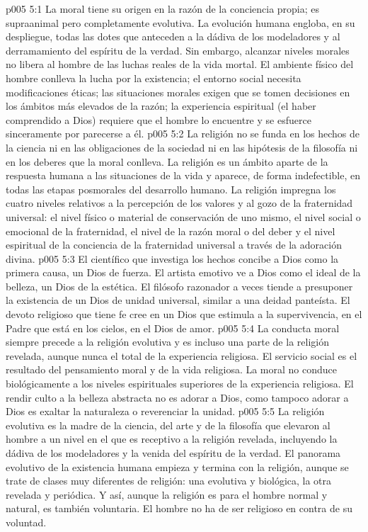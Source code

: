 \vs p005 5:1 La moral tiene su origen en la razón de la conciencia propia; es supraanimal pero completamente evolutiva. La evolución humana engloba, en su despliegue, todas las dotes que anteceden a la dádiva de los modeladores y al derramamiento del espíritu de la verdad. Sin embargo, alcanzar niveles morales no libera al hombre de las luchas reales de la vida mortal. El ambiente físico del hombre conlleva la lucha por la existencia; el entorno social necesita modificaciones éticas; las situaciones morales exigen que se tomen decisiones en los ámbitos más elevados de la razón; la experiencia espiritual (el haber comprendido a Dios) requiere que el hombre lo encuentre y se esfuerce sinceramente por parecerse a él.
\vs p005 5:2 La religión no se funda en los hechos de la ciencia ni en las obligaciones de la sociedad ni en las hipótesis de la filosofía ni en los deberes que la moral conlleva. La religión es un ámbito aparte de la respuesta humana a las situaciones de la vida y aparece, de forma indefectible, en todas las etapas posmorales del desarrollo humano. La religión impregna los cuatro niveles relativos a la percepción de los valores y al gozo de la fraternidad universal: el nivel físico o material de conservación de uno mismo, el nivel social o emocional de la fraternidad, el nivel de la razón moral o del deber y el nivel espiritual de la conciencia de la fraternidad universal a través de la adoración divina.
\vs p005 5:3 El científico que investiga los hechos concibe a Dios como la primera causa, un Dios de fuerza. El artista emotivo ve a Dios como el ideal de la belleza, un Dios de la estética. El filósofo razonador a veces tiende a presuponer la existencia de un Dios de unidad universal, similar a una deidad panteísta. El devoto religioso que tiene fe cree en un Dios que estimula a la supervivencia, en el Padre que está en los cielos, en el Dios de amor.
\vs p005 5:4 \pc La conducta moral siempre precede a la religión evolutiva y es incluso una parte de la religión revelada, aunque nunca el total de la experiencia religiosa. El servicio social es el resultado del pensamiento moral y de la vida religiosa. La moral no conduce biológicamente a los niveles espirituales superiores de la experiencia religiosa. El rendir culto a la belleza abstracta no es adorar a Dios, como tampoco adorar a Dios es exaltar la naturaleza o reverenciar la unidad.
\vs p005 5:5 La religión evolutiva es la madre de la ciencia, del arte y de la filosofía que elevaron al hombre a un nivel en el que es receptivo a la religión revelada, incluyendo la dádiva de los modeladores y la venida del espíritu de la verdad. El panorama evolutivo de la existencia humana empieza y termina con la religión, aunque se trate de clases muy diferentes de religión: una evolutiva y biológica, la otra revelada y periódica. Y así, aunque la religión es para el hombre normal y natural, es también voluntaria. El hombre no ha de ser religioso en contra de su voluntad.
